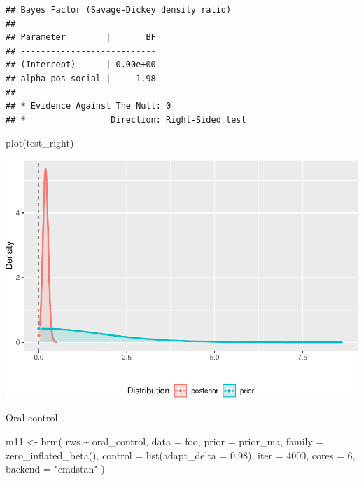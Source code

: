 \documentclass[
]{article}
\newenvironment{Shaded}{\begin{snugshade}}{\end{snugshade}}
\newcommand{\AttributeTok}[1]{\textcolor[rgb]{0.77,0.63,0.00}{#1}}
\newcommand{\DecValTok}[1]{\textcolor[rgb]{0.00,0.00,0.81}{#1}}
\newcommand{\FloatTok}[1]{\textcolor[rgb]{0.00,0.00,0.81}{#1}}
\newcommand{\FunctionTok}[1]{\textcolor[rgb]{0.00,0.00,0.00}{#1}}
\newcommand{\NormalTok}[1]{#1}
\newcommand{\OtherTok}[1]{\textcolor[rgb]{0.56,0.35,0.01}{#1}}
\newcommand{\SpecialCharTok}[1]{\textcolor[rgb]{0.00,0.00,0.00}{#1}}
\newcommand{\StringTok}[1]{\textcolor[rgb]{0.31,0.60,0.02}{#1}}
\begin{document}
\begin{verbatim}
## Bayes Factor (Savage-Dickey density ratio)
## 
## Parameter        |       BF
## ---------------------------
## (Intercept)      | 0.00e+00
## alpha_pos_social |     1.98
## 
## * Evidence Against The Null: 0
## *                 Direction: Right-Sided test
\end{verbatim}

\begin{Shaded}
\begin{Highlighting}[]
\FunctionTok{plot}\NormalTok{(test\_right)}
\end{Highlighting}
\end{Shaded}

\includegraphics{046_weight_history_alpha_files/figure-latex/unnamed-chunk-10-2.pdf}

Oral control

\begin{Shaded}
\begin{Highlighting}[]
\NormalTok{m11 }\OtherTok{\textless{}{-}} \FunctionTok{brm}\NormalTok{(}
\NormalTok{  rws }\SpecialCharTok{\textasciitilde{}}\NormalTok{ oral\_control,}
  \AttributeTok{data =}\NormalTok{ foo, }
  \AttributeTok{prior =}\NormalTok{ prior\_ma,}
  \AttributeTok{family =} \FunctionTok{zero\_inflated\_beta}\NormalTok{(),}
  \AttributeTok{control =} \FunctionTok{list}\NormalTok{(}\AttributeTok{adapt\_delta =} \FloatTok{0.98}\NormalTok{),}
  \AttributeTok{iter =} \DecValTok{4000}\NormalTok{,}
  \AttributeTok{cores =} \DecValTok{6}\NormalTok{,}
  \AttributeTok{backend =} \StringTok{"cmdstan"}
\NormalTok{)}
\end{Highlighting}
\end{Shaded}
\end{document}
